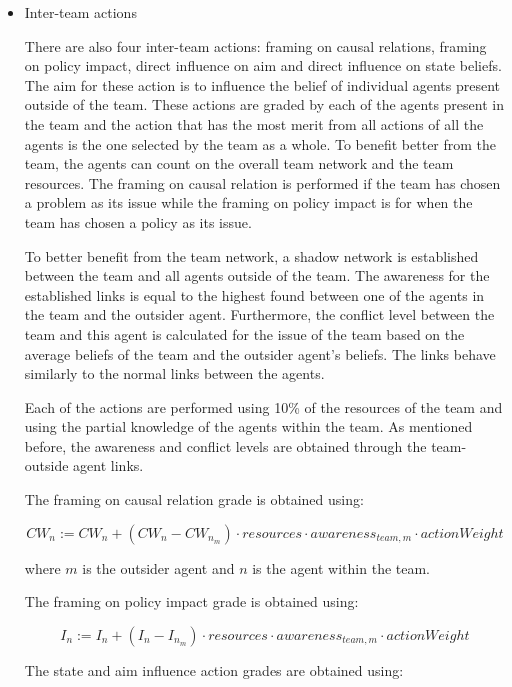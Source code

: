 \begin{itemize}
\item Inter-team actions


There are also four inter-team actions: framing on causal relations, framing on policy impact, direct influence on aim and direct influence on state beliefs. The aim for these action is to influence the belief of individual agents present outside of the team. These actions are graded by each of the agents present in the team and the action that has the most merit from all actions of all the agents is the one selected by the team as a whole. To benefit better from the team, the agents can count on the overall team network and the team resources. The framing on causal relation is performed if the team has chosen a problem as its issue while the framing on policy impact is for when the team has chosen a policy as its issue.


To better benefit from the team network, a shadow network is established between the team and all agents outside of the team. The awareness for the established links is equal to the highest found between one of the agents in the team and the outsider agent. Furthermore, the conflict level between the team and this agent is calculated for the issue of the team based on the average beliefs of the team and the outsider agent's beliefs. The links behave similarly to the normal links between the agents.


Each of the actions are performed using 10\% of the resources of the team and using the partial knowledge of the agents within the team. As mentioned before, the awareness and conflict levels are obtained through the team-outside agent links.


The framing on causal relation grade is obtained using:


\begin{equation}
CW_n :=  CW_n + \left(CW_{n} - CW_{n_m} \right) \cdot resources \cdot awareness_{team,m}  \cdot actionWeight
\end{equation}


where $m$ is the outsider agent and $n$ is the agent within the team.


The framing on policy impact grade is obtained using:


\begin{equation}
I_n :=  I_n + \left(I_{n} - I_{n_m} \right) \cdot resources \cdot awareness_{team,m}  \cdot actionWeight
\end{equation}


The state and aim influence action grades are obtained using:



\end{itemize}
